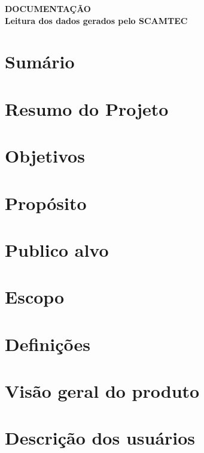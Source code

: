 \documentclass[11pt]{article}
\begin{document}
\begin{center}
    \large{\textbf{DOCUMENTAÇÃO}}\\
    \vspace{1cm}
    \large{\textbf{Leitura dos dados gerados pelo SCAMTEC}}
\end{center}

\section{Sumário}

\newpage

\section{Resumo do Projeto}

\newpage

\section{Objetivos}

\newpage

\section{Propósito}

\newpage

\section{Publico alvo}

\newpage

\section{Escopo}

\newpage

\section{Definições }

\newpage

\section{Visão geral do produto}

\newpage

\section{Descrição dos usuários}
\end{document}
